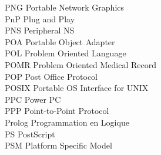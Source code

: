 \begin{tabbing}
    \>PNG \>\>Portable Network Graphics\\

    \>PnP \>\>Plug and Play\\

    \>PNS \>\>Peripheral NS\\

    \>POA \>\>Portable Object Adapter\\

    \>POL \>\>Problem Oriented Language\\

    \>POMR \>\>Problem Oriented Medical Record\\

    \>POP \>\>Post Office Protocol\\

    \>POSIX \>\>Portable OS Interface for UNIX\\


    \>PPC \>\>Power PC\\

    \>PPP \>\>Point-to-Point Protocol\\




    \>Prolog \>\>Programmation en Logique\\

    \>PS \>\>PostScript\\

    \>PSM \>\>Platform Specific Model\\







\end{tabbing}
